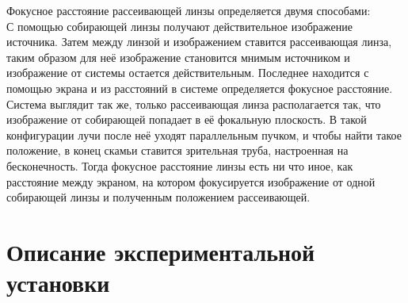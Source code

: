 Фокусное расстояние рассеивающей линзы определяется двумя способами:\\
 С помощью собирающей линзы получают действительное изображение источника. Затем между линзой и изображением ставится рассеивающая линза, таким образом для неё изображение становится мнимым источником и изображение от системы остается действительным. Последнее находится с помощью экрана и из расстояний в системе определяется фокусное расстояние.\\
 Система выглядит так же, только рассеивающая линза располагается так, что изображение от собирающей попадает в её фокальную плоскость. В такой конфигурации лучи после неё уходят параллельным пучком, и чтобы найти такое положение, в конец скамьи ставится зрительная труба, настроенная на бесконечность. Тогда фокусное расстояние линзы есть ни что иное, как расстояние между экраном, на котором фокусируется изображение от одной собирающей линзы и полученным положением рассеивающей.\\


\section*{Описание экспериментальной установки}
